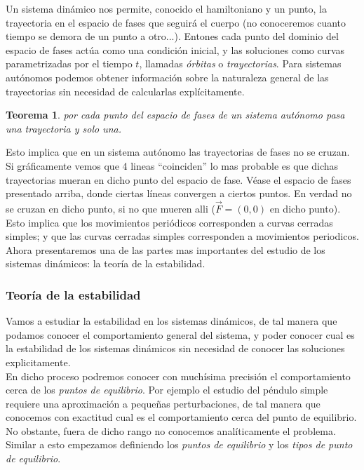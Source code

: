 \documentclass[12pt,a4paper]{article}
\numberwithin{equation}{section}
\numberwithin{figure}{section}
\newtheorem{theorem}{Teorema}[section]
\begin{document}
Un sistema dinámico nos permite, conocido el hamiltoniano y un punto, la trayectoria en el espacio de fases que seguirá el cuerpo (no conoceremos  cuanto tiempo se demora de un punto a otro...). Entones cada punto del dominio del espacio de fases actúa como una condición inicial, y las soluciones como curvas parametrizadas por el tiempo $t$, llamadas \textit{órbitas} o \textit{trayectorias}. Para sistemas autónomos podemos obtener información sobre la naturaleza general de las trayectorias sin necesidad de calcularlas explícitamente. 

\begin{theorem}
por cada punto del espacio de fases de un sistema autónomo pasa una trayectoria y solo una.
\end{theorem}

Esto implica que en un sistema autónomo las trayectorias de fases no se cruzan. Si gráficamente vemos que 4 lineas ``coinciden'' lo mas probable es que dichas trayectorias mueran en dicho punto del espacio de fase. Véase el espacio de fases presentado arriba, donde ciertas líneas convergen a ciertos puntos. En verdad no se cruzan en dicho punto, si no que mueren alli ($\vec{F} = (0,0)$ en dicho punto). Esto implica que los movimientos periódicos corresponden a curvas cerradas simples; y que las curvas cerradas simples corresponden a movimientos periodicos. \\

Ahora presentaremos una de las partes mas importantes del estudio de los sistemas dinámicos: la teoría de la estabilidad.

\subsubsection{Teoría de la estabilidad}

Vamos a estudiar la estabilidad en los sistemas dinámicos, de tal manera que podamos conocer el comportamiento general del sistema, y poder conocer cual es la estabilidad de los sistemas dinámicos sin necesidad de conocer las soluciones explicitamente.  \\

En dicho proceso podremos conocer con muchísima precisión el comportamiento cerca de los \textit{puntos de equilibrio}. Por ejemplo el estudio del péndulo simple requiere una aproximación a pequeñas perturbaciones, de tal manera que conocemos con exactitud cual es el comportamiento cerca del punto de equilibrio. No obstante, fuera de dicho rango no conocemos analíticamente el problema. Similar a esto empezamos definiendo los \textit{puntos de equilibrio} y los \textit{tipos de punto de equilibrio}.
\end{document}
